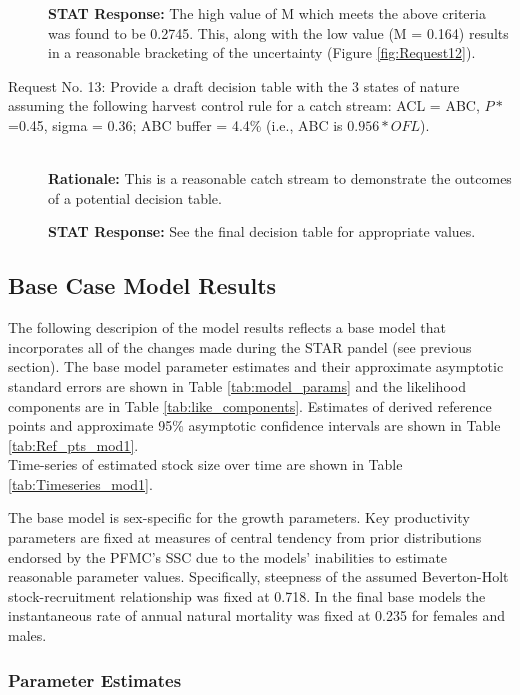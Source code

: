 \documentclass[12pt,]{article}
\begin{document}
\begin{description}
  
\textbf{STAT Response:} The high value of M which meets the above criteria was found to be 
    0.2745. This, along with the low value (M = 0.164) results in a reasonable bracketing of 
    the uncertainty (Figure \ref{fig:Request12}). 

\item[Request No. 13: Provide a draft decision table with the 3 states of nature assuming the 
following harvest control rule for a catch stream:  ACL = ABC, $P*$=0.45, sigma = 0.36; 
ABC buffer = 4.4\% (i.e., ABC is $0.956*OFL$).] \hfill \\

\textbf{Rationale:} This is a reasonable catch stream to demonstrate the outcomes of a 
    potential decision table.
  
\textbf{STAT Response:} See the final decision table for appropriate values.

\end{description}

\subsection{Base Case Model Results}\label{base-case-model-results}

The following descripion of the model results reflects a base model that
incorporates all of the changes made during the STAR pandel (see
previous section). The base model parameter estimates and their
approximate asymptotic standard errors are shown in Table
\ref{tab:model_params} and the likelihood components are in Table
\ref{tab:like_components}. Estimates of derived reference points and
approximate 95\% asymptotic confidence intervals are shown in Table
\ref{tab:Ref_pts_mod1}.\\
Time-series of estimated stock size over time are shown in Table
\ref{tab:Timeseries_mod1}.

The base model is sex-specific for the growth parameters. Key
productivity parameters are fixed at measures of central tendency from
prior distributions endorsed by the PFMC's SSC due to the models'
inabilities to estimate reasonable parameter values. Specifically,
steepness of the assumed Beverton-Holt stock-recruitment relationship
was fixed at 0.718. In the final base models the instantaneous rate of
annual natural mortality was fixed at 0.235 for females and males.

\subsubsection{Parameter Estimates}\label{parameter-estimates}
\end{document}
